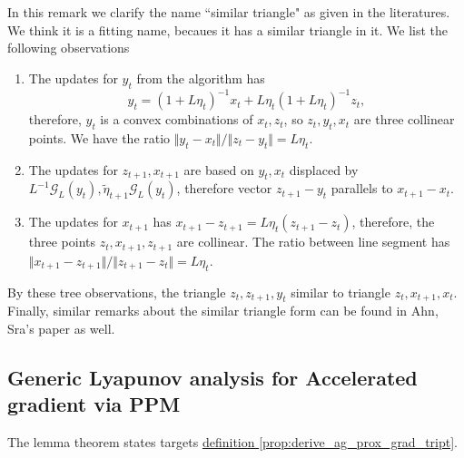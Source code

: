 \documentclass[12pt]{article}
\begin{document}
            \begin{remark}
                In this remark we clarify the name ``similar triangle" as given in the literatures. 
                We think it is a fitting name, becaues it has a similar triangle in it. 
                We list the following observations
                \begin{enumerate}
                    \item 
                    The updates for $y_{t}$ from the algorithm has 
                    $$
                        y_t = (1 + L\eta_t)^{-1} x_t + L\eta_t(1 + L\eta_t)^{-1} z_t, 
                    $$
                    therefore, $y_t$ is a convex combinations of $x_t, z_t$, so $z_t, y_t, x_t$ are three collinear points. 
                    We have the ratio $\Vert y_t - x_t\Vert/\Vert z_t - y_t\Vert = L\eta_t$. 
                    \item 
                    The updates for $z_{t + 1}, x_{t + 1}$ are based on $y_t, x_t$ displaced by $L^{-1} \mathcal G_L(y_t), \tilde\eta_{t +1} \mathcal G_L(y_t)$, therefore vector $z_{t + 1} - y_t$ parallels to $x_{t + 1} - x_t$. 
                    \item The updates for $x_{t + 1}$ has $x_{t + 1} - z_{t + 1} = L\eta_t \left(z_{t + 1} - z_t\right)$, therefore, the three points $z_t, x_{t + 1}, z_{t + 1}$ are collinear. 
                    The ratio between line segment has $\Vert x_{t + 1} - z_{t + 1}\Vert/\Vert z_{t + 1} - z_t\Vert = L\eta_t$. 
                \end{enumerate}
                By these tree observations, the triangle $z_{t}, z_{t + 1}, y_t$ similar to triangle $z_t, x_{t + 1}, x_t$. 
                Finally, similar remarks about the similar triangle form can be found in Ahn, Sra's paper \cite{ahn_understanding_2022} as well. 
                
            \end{remark}
            

    \subsection{Generic Lyapunov analysis for Accelerated gradient via PPM}
    \label{sec:generic_ag_ppm_lyapunov_analysis}
        The lemma theorem states targets
        \hyperref[prop:derive_ag_prox_grad_tript]
        {definition \ref*{prop:derive_ag_prox_grad_tript}}. 
\end{document}
